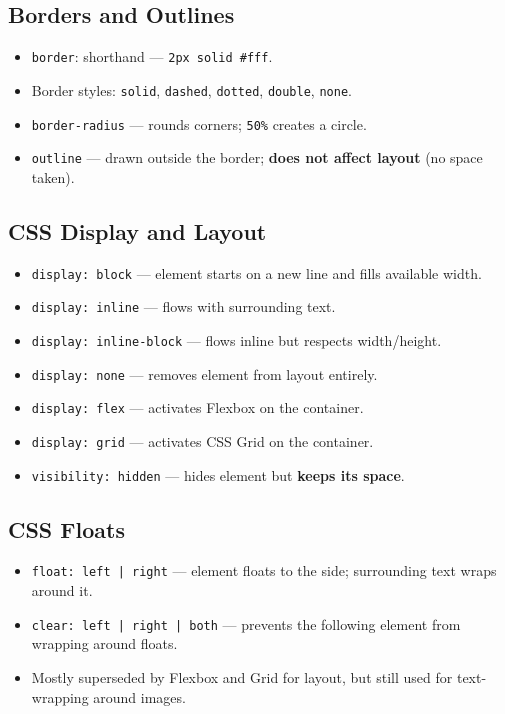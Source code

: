 \documentclass[hidelinks]{article}
\begin{document}
\subsection{Borders and Outlines}
\begin{itemize}
  \item \texttt{border}: shorthand --- \texttt{2px solid \#fff}.
  \item Border styles: \texttt{solid}, \texttt{dashed}, \texttt{dotted}, \texttt{double}, \texttt{none}.
  \item \texttt{border-radius} --- rounds corners; \texttt{50\%} creates a circle.
  \item \texttt{outline} --- drawn outside the border; \textbf{does not affect layout} (no space taken).
\end{itemize}

\subsection{CSS Display and Layout}
\begin{itemize}
  \item \texttt{display: block} --- element starts on a new line and fills available width.
  \item \texttt{display: inline} --- flows with surrounding text.
  \item \texttt{display: inline-block} --- flows inline but respects width/height.
  \item \texttt{display: none} --- removes element from layout entirely.
  \item \texttt{display: flex} --- activates Flexbox on the container.
  \item \texttt{display: grid} --- activates CSS Grid on the container.
  \item \texttt{visibility: hidden} --- hides element but \textbf{keeps its space}.
\end{itemize}

\subsection{CSS Floats}
\begin{itemize}
  \item \texttt{float: left | right} --- element floats to the side; surrounding text wraps around it.
  \item \texttt{clear: left | right | both} --- prevents the following element from wrapping around floats.
  \item Mostly superseded by Flexbox and Grid for layout, but still used for text-wrapping around images.
\end{itemize}
\end{document}
